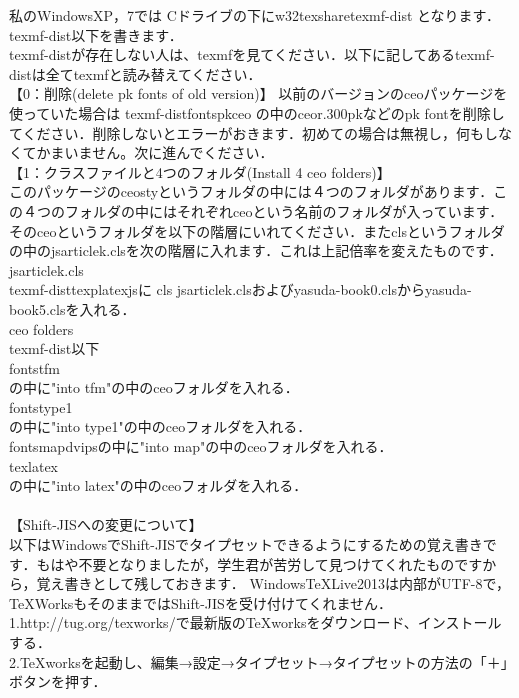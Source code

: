 \documentclass [10pt,fleqn,b5paper]{jsarticlek}
\begin{document}
私のWindowsXP，7では
Cドライブの下に\yy w32tex\yy share\yy texmf-dist
となります．texmf-dist以下を書きます．\\
texmf-distが存在しない人は、texmfを見てください．以下に記してあるtexmf-distは全てtexmfと読み替えてください．\\
【0：削除(delete pk fonts of old version)】
{\gt 以前のバージョンのceoパッケージを使っていた場合}は
\yy texmf-dist\yy fonts\yy pk\yy ceo
の中のceor.300pkなどのpk fontを削除してください．削除しないとエラーがおきます．初めての場合は無視し，何もしなくてかまいません。次に進んでください．\\
【1：クラスファイルと4つのフォルダ(Install 4 ceo folders)】\\
このパッケージのceostyというフォルダの中には４つのフォルダがあります．この４つのフォルダの中にはそれぞれceoという名前のフォルダが入っています．そのceoというフォルダを以下の階層にいれてください．またclsというフォルダの中のjsarticlek.clsを次の階層に入れます．これは上記倍率を変えたものです．
\\
\kakkoichi\;jsarticlek.cls\\
\yy texmf-dist\yy tex\yy platex\yy jsに
cls
jsarticlek.clsおよびyasuda-book0.clsからyasuda-book5.clsを入れる．\\
\kakkoni{} ceo folders\\
\yy texmf-dist以下\\
\yy fonts\yy tfm\\
の中に"into tfm"の中のceoフォルダを入れる．\\
\yy fonts\yy type1\\
の中に"into type1"の中のceoフォルダを入れる．\\
\yy fonts\yy map\yy dvipsの中に"into map"の中のceoフォルダを入れる．\\
\yy tex\yy latex\\
の中に"into latex"の中のceoフォルダを入れる．\\
\\
【{\gt Shift-JISへの変更について}】\\
以下はWindowsでShift-JISでタイプセットできるようにするための覚え書きです．もはや不要となりましたが，学生君が苦労して見つけてくれたものですから，覚え書きとして残しておきます．
WindowsTeXLive2013は内部がUTF-8で，TeXWorksもそのままではShift-JISを受け付けてくれません．\\
1.http://tug.org/texworks/で最新版のTeXworksをダウンロード、インストールする．\\
2.TeXworksを起動し、編集→設定→タイプセット→タイプセットの方法の「＋」ボタンを押す．\\
\end{document}
